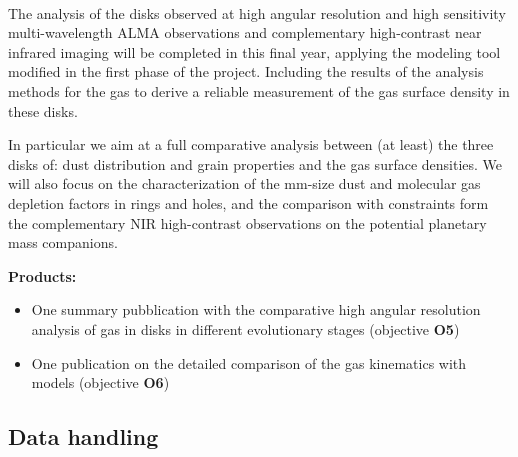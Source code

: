 \documentclass[10pt,fleqn,twoside]{article}
\begin{document}
\vspace{1em}{\Tcol\bf Months 25-36}\\
The analysis of the disks observed at high angular resolution and high sensitivity multi-wavelength ALMA observations and complementary high-contrast near infrared imaging will be completed in this final year, applying the modeling tool modified in the first phase of the project. Including the results of the analysis
methods for the gas to derive a reliable measurement of the gas surface density in these disks. 

In particular we aim at a full comparative analysis between (at least) the three disks of: dust distribution and grain properties and the gas surface densities. We will also focus on the characterization of the mm-size dust and molecular gas depletion factors in rings and holes, and the comparison with constraints form the complementary NIR high-contrast observations on the potential planetary mass companions. 

\smallskip
{\bf Products:} 
\begin{itemize}
\item One summary pubblication with the comparative high angular resolution analysis of gas in disks in different evolutionary stages (objective {\bf O5})
\item One publication on the detailed comparison of the gas kinematics with models (objective {\bf O6})
\end{itemize}


\subsection{Data handling}
\end{document}
